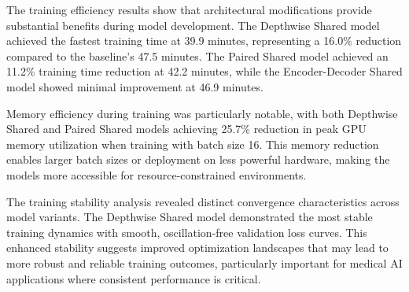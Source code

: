 \documentclass[12pt,a4paper]{article}
\begin{document}
\begin{enumerate}
\begin{table}[H]
\centering
\caption{Training Efficiency Comparison Across Model Variants}
\label{tab:training_efficiency}
\end{table}

The training efficiency results show that architectural modifications provide substantial benefits during model development. The Depthwise Shared model achieved the fastest training time at 39.9 minutes, representing a 16.0\% reduction compared to the baseline's 47.5 minutes. The Paired Shared model achieved an 11.2\% training time reduction at 42.2 minutes, while the Encoder-Decoder Shared model showed minimal improvement at 46.9 minutes.

Memory efficiency during training was particularly notable, with both Depthwise Shared and Paired Shared models achieving 25.7\% reduction in peak GPU memory utilization when training with batch size 16. This memory reduction enables larger batch sizes or deployment on less powerful hardware, making the models more accessible for resource-constrained environments.

The training stability analysis revealed distinct convergence characteristics across model variants. The Depthwise Shared model demonstrated the most stable training dynamics with smooth, oscillation-free validation loss curves. This enhanced stability suggests improved optimization landscapes that may lead to more robust and reliable training outcomes, particularly important for medical AI applications where consistent performance is critical.


\end{enumerate}
\end{document}

